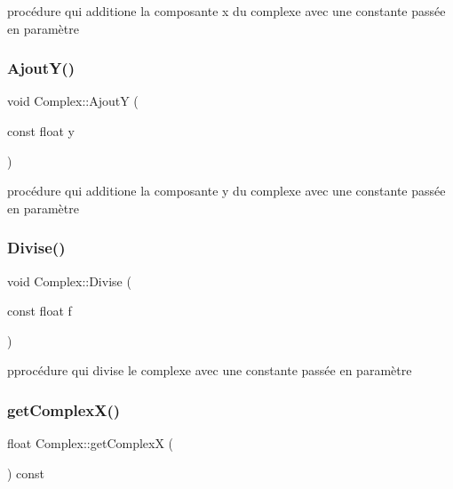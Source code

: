 procédure qui additione la composante x du complexe avec une constante passée en paramètre 

\mbox{\label{classComplex_a8bc2ed7cad179a8dad0d18f68450d6e4}} 
\subsubsection{\texorpdfstring{Ajout\+Y()}{AjoutY()}}
{\footnotesize\ttfamily void Complex\+::\+AjoutY (\begin{DoxyParamCaption}\item[{const float}]{y }\end{DoxyParamCaption})}



procédure qui additione la composante y du complexe avec une constante passée en paramètre 

\mbox{\label{classComplex_a63ad91cacff2e8156d32243ace56c66b}} 
\subsubsection{\texorpdfstring{Divise()}{Divise()}}
{\footnotesize\ttfamily void Complex\+::\+Divise (\begin{DoxyParamCaption}\item[{const float}]{f }\end{DoxyParamCaption})}



pprocédure qui divise le complexe avec une constante passée en paramètre 

\mbox{\label{classComplex_acbb1e195b5cf17f1234ad6e4d556d231}} 
\subsubsection{\texorpdfstring{get\+Complex\+X()}{getComplexX()}}
{\footnotesize\ttfamily float Complex\+::get\+ComplexX (\begin{DoxyParamCaption}{ }\end{DoxyParamCaption}) const}



